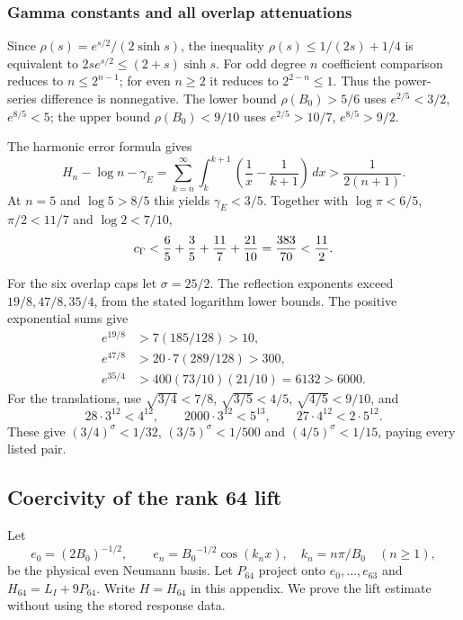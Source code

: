 \documentclass[11pt,a4paper]{article}
\numberwithin{equation}{section}
\theoremstyle{definition}\newtheorem{definition}[theorem]{Definition}
\theoremstyle{remark}\newtheorem{remark}[theorem]{Remark}
\begin{document}
\subsubsection{Gamma constants and all overlap attenuations}
Since $\rho(s)=e^{s/2}/(2\sinh s)$, the inequality
$\rho(s)\le1/(2s)+1/4$ is equivalent to
$2se^{s/2}\le(2+s)\sinh s$.
For odd degree $n$ coefficient comparison reduces to $n\le2^{n-1}$;
for even $n\ge2$ it reduces to $2^{2-n}\le1$.
Thus the power-series difference is nonnegative.
The lower bound $\rho({B_0})>5/6$ uses $e^{2/5}<3/2$, $e^{8/5}<5$;
the upper bound $\rho({B_0})<9/10$ uses $e^{2/5}>10/7$, $e^{8/5}>9/2$.

The harmonic error formula gives
\[
 H_n-\log n-\gamma_E
 =\sum_{k=n}^\infty\int_k^{k+1}\left(\frac1x-\frac1{k+1}\right)\,dx
 >\frac1{2(n+1)}.
\]
At $n=5$ and $\log5>8/5$ this yields $\gamma_E<3/5$.
Together with $\log\pi<6/5$, $\pi/2<11/7$ and $\log2<7/10$,
\[
 c_\Gamma<\frac65+\frac35+\frac{11}{7}+\frac{21}{10}
 =\frac{383}{70}<\frac{11}{2}.
\]

For the six overlap caps let $\sigma=25/2$.
The reflection exponents exceed $19/8,47/8,35/4$, from the stated logarithm lower bounds.
The positive exponential sums give
\begin{align*}
 e^{19/8}&>7(185/128)>10,\\
 e^{47/8}&>20\cdot7(289/128)>300,\\
 e^{35/4}&>400(73/10)(21/10)=6132>6000.
\end{align*}
For the translations, use
$\sqrt{3/4}<7/8$, $\sqrt{3/5}<4/5$, $\sqrt{4/5}<9/10$, and
\[
 28\cdot3^{12}<4^{12},\qquad
 2000\cdot3^{12}<5^{13},\qquad
 27\cdot4^{12}<2\cdot5^{12}.
\]
These give $(3/4)^\sigma<1/32$, $(3/5)^\sigma<1/500$ and
$(4/5)^\sigma<1/15$, paying every listed pair.


\subsection{Coercivity of the rank 64 lift}\label{c:sec:lift}
Let
\[
 e_0=(2{B_0})^{-1/2},\qquad e_n={B_0}^{-1/2}\cos(k_nx),\quad
 k_n=n\pi/{B_0}\quad(n\ge1),
\]
be the physical even Neumann basis. Let $P_{64}$ project onto
$e_0,\ldots,e_{63}$ and $H_{64}=L_I+9P_{64}$. Write $H=H_{64}$ in this appendix. We prove the lift estimate
without using the stored response data.
\end{document}
